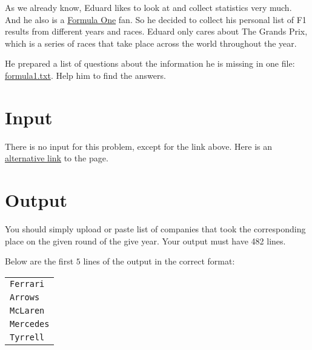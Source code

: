 As we already know, Eduard likes to look at and collect statistics very much.
And he also is a \href{https://en.wikipedia.org/wiki/Formula_One}{Formula One} fan.
So he decided to collect his personal list of F1 results from different years and races.
Eduard only cares about The Grands Prix, which is a series of races that take place across the world throughout the year.

He prepared a list of questions about the information he is missing in one file:
\href{http://ejudge.rau.am/ejudge/formula1.txt}{formula1.txt}.
Help him to find the answers.
%
%

\section*{Input}
There is no input for this problem, except for the link above.
Here is an \href{http://167.71.248.201/ejudge/formula1.txt}{alternative link} to the page.

\section*{Output}
You should simply upload or paste list of companies that took the corresponding place on the given round of the give year.
Your output must have 482 lines.

Below are the first $5$ lines of the output in the correct format:
\begin{center}
    \begin{tabular}{l}
        \texttt{Ferrari} \\
        \texttt{Arrows} \\
        \texttt{McLaren} \\
        \texttt{Mercedes} \\
        \texttt{Tyrrell}
    \end{tabular}
\end{center}
